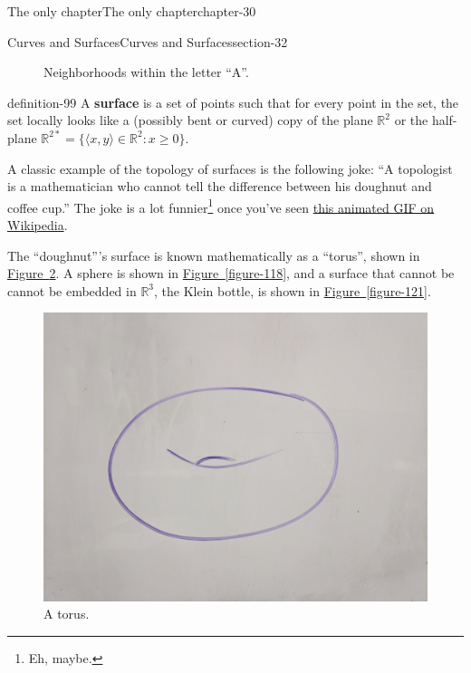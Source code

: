 \documentclass[oneside,10pt,]{book}
\newcommand{\terminology}[1]{\textbf{#1}}
\newcommand{\tuple}[1]{\langle #1 \rangle}
\newcommand{\mb}{\mathbb}
\begin{document}
\begin{chapterptx}{The only chapter}{}{The only chapter}{}{}{chapter-30}
\begin{sectionptx}{Curves and Surfaces}{}{Curves and Surfaces}{}{}{section-32}
\begin{figure}
\caption{Neighborhoods within the letter ``A''.\label{figure-95}}
\end{figure}
\begin{definition}{}{definition-99}%
\hypertarget{p-100}{}%
A \terminology{surface} is a set of points such that for every point in the set, the set locally looks like a (possibly bent or curved) copy of the plane \(\mathbb R^2\) or the half-plane \(\mathbb R^{2*}=\{\tuple{x,y}\in\mb R^2:x\geq 0\}\).%
\end{definition}
\hypertarget{p-104}{}%
A classic example of the topology of surfaces is the following joke: ``A topologist is a mathematician who cannot tell the difference between his doughnut and coffee cup.'' The joke is a lot funnier\footnote{Eh, maybe.\label{fn-106}} once you've seen \href{https://en.wikipedia.org/wiki/File:Mug_and_Torus_morph.gif}{this animated GIF on Wikipedia}.%
\par
\hypertarget{p-108}{}%
The ``doughnut'''s surface is known mathematically as a ``torus'', shown in \hyperref[figure-115]{Figure~\ref{figure-115}}. A sphere is shown in \hyperref[figure-118]{Figure~\ref{figure-118}}, and a surface that cannot be cannot be embedded in \(\mathbb R^3\), the Klein bottle, is shown in \hyperref[figure-121]{Figure~\ref{figure-121}}.%
\begin{figure}
\centering
\includegraphics[width=1\linewidth]{images/torus.jpg}
\caption{A torus.\label{figure-115}}
\end{figure}
\begin{figure}
\centering

\end{figure}
\end{sectionptx}
\end{chapterptx}
\end{document}
